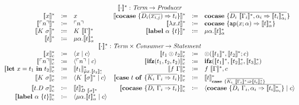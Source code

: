\[
  \begin{array}{rcl rcl}
    \multicolumn{6}{c}{\translatestar{\cdot}{} : \emph{Term} \rightarrow  \emph{Producer}}\\
    \translatestar{x}{} & \coloneqq & x & 
    \translatestar{\cocase{\overline{D_i(\overline{x_{i,j}}) \Rightarrow t_i}}}{} & \coloneq & \cocase{\overline{D_i\ \translatestar{\Gamma_i}{},\alpha_i \Rightarrow \translatestar{t_i}{\alpha_i}}} \\
    \translatestar{\lit{n}}{} & \coloneqq & \lit{n}  &
    \translatestar{\lambda x.t}{} & \coloneq & \cocase{\mathtt{ap}(x; \alpha) \Rightarrow \translatestar{t}{\alpha}} \\
    \translatestar{K\ \sigma}{} & \coloneqq & K\ \translatestar{\Gamma}{} &
    \translatestar{\lab{\alpha}{t}}{} & \coloneq & \mu \alpha.\translatestar{t}{\alpha}{} \\
    \translatestar{t}{} & \coloneqq & \mu\alpha.\translatestar{t}{\alpha} &  &
    \\
    \multicolumn{6}{c}{\translatestar{\cdot}{\cdot} : \emph{Term} \times \emph{Consumer} \rightarrow \emph{Statement}}\\
    \translatestar{x}{c} & \coloneq & \cut{x}{c} & 
    \translatestar{t_1 \odot t_2}{c} & \coloneq & \odot(\translatestar{t_1}{}, \translatestar{t_2}{}; c)  \\
    \translatestar{\lit{n}}{c} & \coloneq & \cut{\lit{n}}{c} & 
    \translatestar{\ifz{t_1}{t_2}{t_2}}{c} & \coloneq & \ifz{\translatestar{t_1}{}}{\translatestar{t_2}{c}}{\translatestar{t_3}{c}}  \\
    \translatestar{\letin{x}{t_1}{t_2}}{c} & \coloneq & \translatestar{t_1}{\tilde{\mu}x.\translatestar{t_2}{c}} & 
    \translatestar{f\ \Gamma}{c} & \coloneq & f\ \translatestar{\Gamma}{},c \\
    \translatestar{K\ \sigma}{c} & \coloneq & \cut{K\ \translatestar{\sigma}{}}{c} & 
    \translatestar{\caseof{t}{\overline{K_i\ \Gamma_i \Rightarrow t_i}}}{c} & \coloneq & \translatestar{t}{\case{\overline{K_i\ \translatestar{\Gamma_i}{} \Rightarrow \translatestar{t_i}{c}}}} \\
    \translatestar{t.D\ \sigma}{c} & \coloneq & \translatestar{t}{D\ \translatestar{\sigma}{}} &
    \translatestar{\cocase{\overline{D_i\ \Gamma_i \Rightarrow t_i}}}{c} & \coloneq & \cut{\cocase{\overline{D_i\ \Gamma_i,\alpha_i \Rightarrow \translatestar{t_i}{\alpha_i}}}}{c}  \\
    \translatestar{\lab{\alpha}{t}}{c} & \coloneq & \cut{\mu \alpha.\translatestar{t}{\alpha}}{c} & 

\end{array}\]
